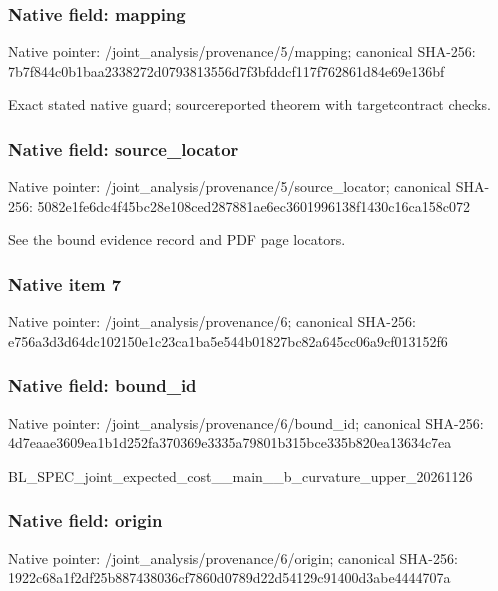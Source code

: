 \documentclass[10pt,a4paper]{article}
\begin{document}
\subsubsection{Native field: mapping}


Native pointer: /joint\_analysis/provenance/5/mapping; canonical SHA-256: 7b7f844c0b1baa2338272d07\allowbreak{}93813556d7f3bfddcf117f76\allowbreak{}2861d84e69e136bf


Exact stated native guard; sourcereported theorem with targetcontract checks.


\subsubsection{Native field: source\_locator}


Native pointer: /joint\_analysis/provenan\allowbreak{}ce/5/source\_locator; canonical SHA-256: 5082e1fe6dc4f45bc28e108c\allowbreak{}ed287881ae6ec3601996138f\allowbreak{}1430c16ca158c072


See the bound evidence record and PDF page locators.


\subsubsection{Native item 7}


Native pointer: /joint\_analysis/provenance/6; canonical SHA-256: e756a3d3d64dc102150e1c23\allowbreak{}ca1ba5e544b01827bc82a645\allowbreak{}cc06a9cf013152f6



\subsubsection{Native field: bound\_id}


Native pointer: /joint\_analysis/provenance/6/bound\_id; canonical SHA-256: 4d7eaae3609ea1b1d252fa37\allowbreak{}0369e3335a79801b315bce33\allowbreak{}5b820ea13634c7ea


BL\_SPEC\_joint\_expected\_c\allowbreak{}ost\_\_main\_\_b\_curvature\_u\allowbreak{}pper\_20261126


\subsubsection{Native field: origin}


Native pointer: /joint\_analysis/provenance/6/origin; canonical SHA-256: 1922c68a1f2df25b88743803\allowbreak{}6cf7860d0789d22d54129c91\allowbreak{}400d3abe4444707a
\end{document}
